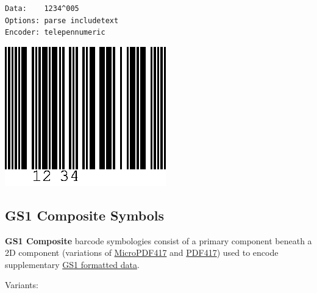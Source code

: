 \begin{verbatim}
Data:    1234^005
Options: parse includetext
Encoder: telepennumeric
\end{verbatim}

\includegraphics{images/telepen-5.eps}

\hypertarget{gs1-composite-symbols}{%
\subsection{GS1 Composite Symbols}\label{gs1-composite-symbols}}

\textbf{GS1 Composite} barcode symbologies consist of a primary
component beneath a 2D component (variations of
\protect\hyperlink{micropdf417}{MicroPDF417} and
\protect\hyperlink{pdf417}{PDF417}) used to encode supplementary
\protect\hyperlink{gs1-application-identifier-standard-format}{GS1
formatted data}.

Variants:

